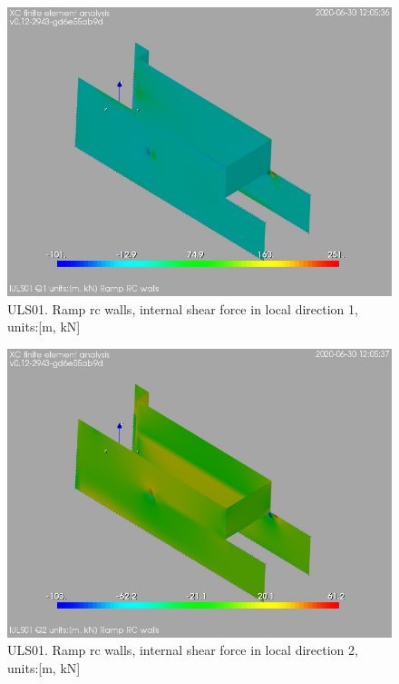 \begin{figure}
\begin{center}
\includegraphics[width=\linewidth]{ramp_wall/resLC/text/graphics/resSimplLC/lULS01wallsQ1}
\caption{ULS01. Ramp rc walls, internal shear force in local direction 1, units:[m, kN]}
\end{center}
\end{figure}
\begin{figure}
\begin{center}
\includegraphics[width=\linewidth]{ramp_wall/resLC/text/graphics/resSimplLC/lULS01wallsQ2}
\caption{ULS01. Ramp rc walls, internal shear force in local direction 2, units:[m, kN]}
\end{center}
\end{figure}
